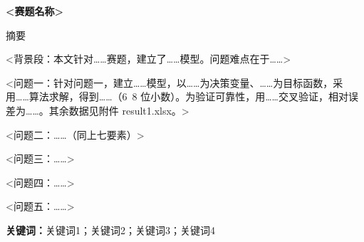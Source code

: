 \documentclass[11pt]{ctexart}
\begin{document}
\begin{center}
{\heiti\bfseries <赛题名称>}
\end{center}

\vspace{1.0em}
\begin{center}
{\heiti 摘要}
\end{center}

\vspace{0.6em}
<背景段：本文针对……赛题，建立了……模型。问题难点在于……>

<问题一：针对问题一，建立……模型，以……为决策变量、……为目标函数，采用……算法求解，得到……（6~8 位小数）。为验证可靠性，用……交叉验证，相对误差为……。其余数据见附件 result1.xlsx。>

<问题二：……（同上七要素）>

<问题三：……>

<问题四：……>

<问题五：……>

\vspace{0.6em}
\noindent\textbf{关键词：}关键词1；关键词2；关键词3；关键词4
\setcounter{page}{1}
\newpage

%
%
\end{document}
